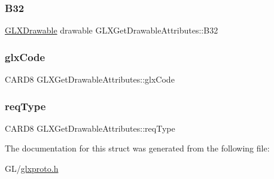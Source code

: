 \subsubsection{\texorpdfstring{B32}{B32}}
{\footnotesize\ttfamily \hyperlink{glx_8h_a826f51745d9d6c81bdbac47ae2b80cf7}{G\+L\+X\+Drawable} drawable G\+L\+X\+Get\+Drawable\+Attributes\+::\+B32}

\mbox{\label{struct_g_l_x_get_drawable_attributes_abe646337455905bb73f85fde2e880623}} 
\subsubsection{\texorpdfstring{glx\+Code}{glxCode}}
{\footnotesize\ttfamily C\+A\+R\+D8 G\+L\+X\+Get\+Drawable\+Attributes\+::glx\+Code}

\mbox{\label{struct_g_l_x_get_drawable_attributes_ade119b3c3a49bc582afce0555a215bd3}} 
\subsubsection{\texorpdfstring{req\+Type}{reqType}}
{\footnotesize\ttfamily C\+A\+R\+D8 G\+L\+X\+Get\+Drawable\+Attributes\+::req\+Type}



The documentation for this struct was generated from the following file\+:\begin{DoxyCompactItemize}
\item 
G\+L/\hyperlink{glxproto_8h}{glxproto.\+h}\end{DoxyCompactItemize}
